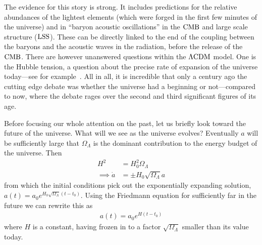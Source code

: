     The evidence for this story is strong. It includes
    predictions for the relative abundances of the lightest
    elements (which were forged in the first few minutes of the universe)
    and in ``baryon acoustic oscillations'' in the $\text{CMB}$ and large scale structure ($\text{LSS}$).
    These can be directly linked to the end of the coupling
    between the baryons and the acoustic waves in the radiation,
    before the release of the $\text{CMB}$.
    There are however unanswered questions within the $\Lambda\text{CDM}$ model.
    One is the Hubble tension, a question about the
    precise rate of expansion of the universe today---see for example~\cite{tensions_2019, Freedman_2021}.
    All in all, it is incredible that only a century ago the cutting edge debate was
    whether the universe had a beginning or not---compared to
    now, where the debate rages over the second and
    third significant figures of its age.


    Before focusing our whole attention on the past, let us briefly
    look toward the future of the universe.
    What will we see as the universe evolves?
    Eventually $a$ will be
    sufficiently large that $\Omega_{\Lambda}$
    is the dominant contribution to the energy budget of the universe.
    Then
    \begin{align}
        H^2 &= H_0^2\Omega_{\Lambda}\\
        \implies \dot{a} &= \pm H_0\sqrt{\Omega_{\Lambda}}a
    \end{align}
    from which the initial conditions pick out the exponentially expanding solution,\\
    ${a(t)=a_0e^{H_0\sqrt{\Omega_{\Lambda}}\left(t-t_0\right)}}$. Using the Friedmann equation
    for sufficiently far in the future we can rewrite this as
    \begin{align}
        a(t)=a_0e^{H\left(t-t_0\right)}
    \end{align}
    where $H$ is a constant, having frozen in to a factor $\sqrt{\Omega_{\Lambda}}$ smaller than
    its value today.


